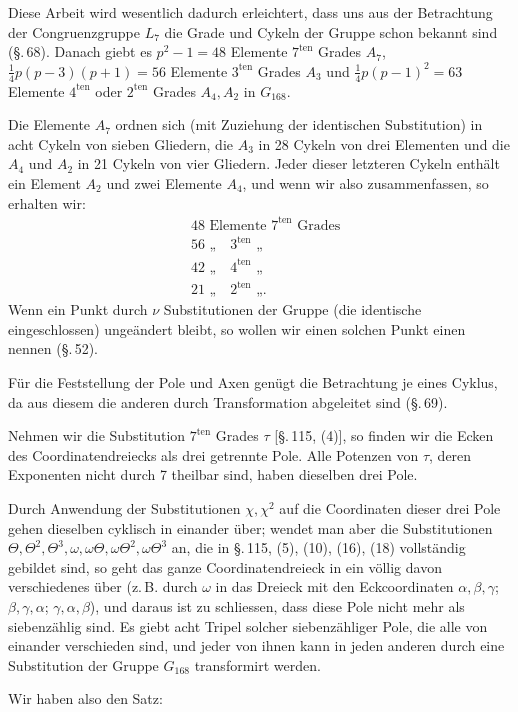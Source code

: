 Diese Arbeit wird wesentlich dadurch erleichtert, dass uns aus der Betrachtung der Congruenzgruppe $L_7$ die Grade und Cykeln der Gruppe schon bekannt sind (\S.\,68). Danach giebt es $p^2-1=48$ Elemente $7^{\text{ten}}$ Grades $A_7$, $\frac14 p(p-3)(p+1)=56$ Elemente $3^{\text{ten}}$ Grades $A_3$ und $\frac14 p(p-1)^2=63$ Elemente $4^{\text{ten}}$ oder $2^{\text{ten}}$ Grades $A_4, A_2$ in $G_{168}$.

Die Elemente $A_7$ ordnen sich (mit Zuziehung der identischen Substitution) in acht Cykeln von sieben Gliedern, die $A_3$ in 28 Cykeln von drei Elementen und die $A_4$ und $A_2$ in 21 Cykeln von vier Gliedern. Jeder dieser letzteren Cykeln enth\"alt ein Element $A_2$ und zwei Elemente $A_4$, und wenn wir also zusammenfassen, so erhalten wir:
\[
\begin{aligned}
&48 \text{ Elemente } 7^{\text{ten}} \text{ Grades}\\
&56 \text{ „} \quad 3^{\text{ten}} \text{ „}\\
&42 \text{ „} \quad 4^{\text{ten}} \text{ „}\\
&21 \text{ „} \quad 2^{\text{ten}} \text{ „}.
\end{aligned}
\]
Wenn ein Punkt durch $\nu$ Substitutionen der Gruppe (die identische eingeschlossen) unge\"andert bleibt, so wollen wir einen solchen Punkt einen  nennen (\S.\,52).

F\"ur die Feststellung der Pole und Axen gen\"ugt die Betrachtung je eines Cyklus, da aus diesem die anderen durch Transformation abgeleitet sind (\S.\,69).

Nehmen wir die Substitution $7^{\text{ten}}$ Grades $\tau$ [\S.\,115, (4)], so finden wir die Ecken des Coordinatendreiecks als drei getrennte Pole. Alle Potenzen von $\tau$, deren Exponenten nicht durch 7 theilbar sind, haben dieselben drei Pole.

Durch Anwendung der Substitutionen $\chi,\chi^2$ auf die Coordinaten dieser drei Pole gehen dieselben cyklisch in einander \"uber; wendet man aber die Substitutionen $\Theta,\Theta^2,\Theta^3,\omega,\omega\Theta,\omega\Theta^2,\omega\Theta^3$ an, die in \S.\,115, (5), (10), (16), (18) vollst\"andig gebildet sind, so geht das ganze Coordinatendreieck in ein v\"ollig davon verschiedenes \"uber (z.\,B. durch $\omega$ in das Dreieck mit den Eckcoordinaten $\alpha,\beta,\gamma$; $\beta,\gamma,\alpha$; $\gamma,\alpha,\beta$), und daraus ist zu schliessen, dass diese Pole nicht mehr als siebenz\"ahlig sind. Es giebt acht Tripel solcher siebenz\"ahliger Pole, die alle von einander verschieden sind, und jeder von ihnen kann in jeden anderen durch eine Substitution der Gruppe $G_{168}$ transformirt werden.

Wir haben also den Satz:
